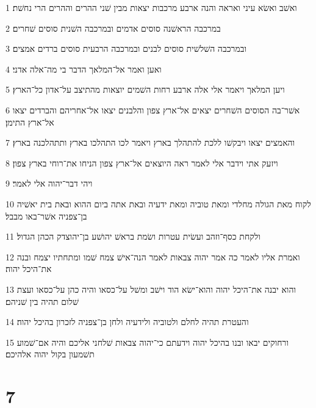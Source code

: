 \par 1 ואשׁב ואשׂא עיני ואראה והנה ארבע מרכבות יצאות מבין שׁני ההרים וההרים הרי נחשׁת׃
\par 2 במרכבה הראשׁנה סוסים אדמים ובמרכבה השׁנית סוסים שׁחרים׃
\par 3 ובמרכבה השׁלשׁית סוסים לבנים ובמרכבה הרבעית סוסים ברדים אמצים׃
\par 4 ואען ואמר אל־המלאך הדבר בי מה־אלה אדני׃
\par 5 ויען המלאך ויאמר אלי אלה ארבע רחות השׁמים יוצאות מהתיצב על־אדון כל־הארץ׃
\par 6 אשׁר־בה הסוסים השׁחרים יצאים אל־ארץ צפון והלבנים יצאו אל־אחריהם והברדים יצאו אל־ארץ התימן׃
\par 7 והאמצים יצאו ויבקשׁו ללכת להתהלך בארץ ויאמר לכו התהלכו בארץ ותתהלכנה בארץ׃
\par 8 ויזעק אתי וידבר אלי לאמר ראה היוצאים אל־ארץ צפון הניחו את־רוחי בארץ צפון׃
\par 9 ויהי דבר־יהוה אלי לאמר׃
\par 10 לקוח מאת הגולה מחלדי ומאת טוביה ומאת ידעיה ובאת אתה ביום ההוא ובאת בית יאשׁיה בן־צפניה אשׁר־באו מבבל׃
\par 11 ולקחת כסף־וזהב ועשׂית עטרות ושׂמת בראשׁ יהושׁע בן־יהוצדק הכהן הגדול׃
\par 12 ואמרת אליו לאמר כה אמר יהוה צבאות לאמר הנה־אישׁ צמח שׁמו ומתחתיו יצמח ובנה את־היכל יהוה׃
\par 13 והוא יבנה את־היכל יהוה והוא־ישׂא הוד וישׁב ומשׁל על־כסאו והיה כהן על־כסאו ועצת שׁלום תהיה בין שׁניהם׃
\par 14 והעטרת תהיה לחלם ולטוביה ולידעיה ולחן בן־צפניה לזכרון בהיכל יהוה׃
\par 15 ורחוקים יבאו ובנו בהיכל יהוה וידעתם כי־יהוה צבאות שׁלחני אליכם והיה אם־שׁמוע תשׁמעון בקול יהוה אלהיכם׃

\chapter{7}

